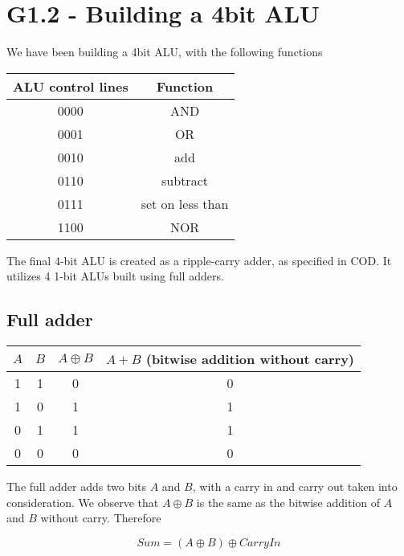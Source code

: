 \documentclass[11pt,a4paper]{article}
\begin{document}

\section*{G1.2 - Building a 4bit ALU}
We have been building a 4bit ALU, with the following functions

\begin{table}[htb!]
    \centering
    \begin{tabular}{| c | c |}
        ALU control lines & Function \\ \hline
        0000 & AND \\
        0001 & OR \\
        0010 & add \\
        0110 & subtract \\
        0111 & set on less than \\
        1100 & NOR \\
    \end{tabular}
\end{table}

The final 4-bit ALU is created as a ripple-carry adder, as specified in COD\@.
It utilizes 4 1-bit ALUs built using full adders.

\subsection*{Full adder} %
\label{sub:Full_adder}

\begin{table}[htb!]
    \centering
    \begin{tabular}{c | c || c || c}
        $A$ & $B$ & $A \oplus B$ & $A + B$ (bitwise addition without carry) \\ \hline
        1 & 1 & 0                & 0        \\
        1 & 0 & 1                & 1        \\
        0 & 1 & 1                & 1        \\
        0 & 0 & 0                & 0        \\
    \end{tabular}
\end{table}

The full adder adds two bits $A$ and $B$, with a carry in and carry out taken into
consideration. We observe that $A \oplus B$ is the same as the bitwise addition
of $A$ and $B$ without carry. Therefore

\begin{equation*}
    Sum = (A \oplus B) \oplus CarryIn
\end{equation*}
\end{document}
